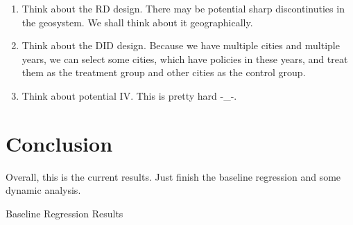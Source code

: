 \documentclass[12pt]{article}
\begin{document}
\begin{enumerate}
  \item Think about the RD design. There may be potential sharp discontinuties in the geosystem. We shall think about it geographically.
  \item Think about the DID design. Because we have multiple cities and multiple years, we can select some cities, which have policies in these years, and treat them as the treatment group and other cities as the control group.
  \item Think about potential IV. This is pretty hard -\_-.
\end{enumerate}

\section{Conclusion\label{sec:conclusion}}

Overall, this is the current results. Just finish the baseline regression and some dynamic analysis.



\clearpage
\begin{singlespace}
%
%


\end{singlespace}


\newpage
\appendix
\setcounter{table}{0}
\renewcommand{\tablename}{Appendix Table}
\renewcommand{\figurename}{Appendix Figure}
\renewcommand{\thetable}{A\arabic{table}}
\setcounter{figure}{0}
\renewcommand{\thefigure}{A\arabic{figure}}

% 


  \begin{table}[H]
    \begin{center}
    \caption{Baseline Regression Results}
    \label{tab:Baseline}   
     
  \end{center}
  \end{table}
\end{document}
